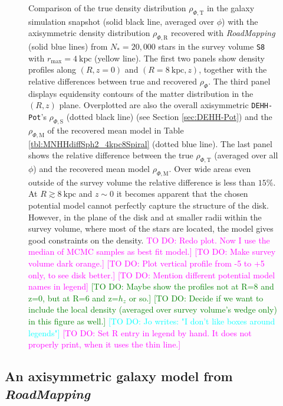 \documentclass[iop,revtex4,numberedappendix,appendixfloats]{emulateapj}
\newcommand{\RM}{{\sl RoadMapping}}
\newcommand{\Wilma}[1]{\textcolor{Magenta}{#1}}
\newcommand{\HW}[1]{\textcolor{Green}{#1}}
\newcommand{\Jo}[1]{\textcolor{Cyan}{#1}}
\begin{document}
\begin{figure}[!htbp]
\caption{Comparison of the true density distribution $\rho_{\Phi,\text{T}}$ in the galaxy simulation snapshot (solid black line, averaged over $\phi$) with the axisymmetric density distribution $\rho_{\Phi,\text{R}}$ recovered with \RM{} (solid blue lines) from $N_*=20,000$ stars in the survey volume \texttt{S8} with $r_\text{max}=4~\text{kpc}$ (yellow line). The first two panels show density profiles along $(R,z=0)$ and $(R=8~\text{kpc},z)$, together with the relative differences between true and recovered $\rho_{\Phi}$. The third panel displays equidensity contours of the matter distribution in the $(R,z)$ plane. Overplotted are also the overall axisymmetric \texttt{DEHH-Pot}'s $\rho_{\Phi,\text{S}}$ (dotted black line) (see Section \ref{sec:DEHH-Pot}) and the $\rho_{\Phi,\text{M}}$ of the recovered mean model in Table \ref{tbl:MNHHdiffSph2_4kpc8Spiral} (dotted blue line). The last panel shows the relative difference between the true $\rho_{\Phi,\text{T}}$ (averaged over all $\phi$) and the recovered mean model $\rho_{\Phi,\text{M}}$. Over wide areas even outside of the survey volume the relative difference is less than $15\%$. At $R\gtrsim8~\text{kpc}$ and $z\sim0$ it becomes apparent that the chosen potential model cannot perfectly capture the structure of the disk. However, in the plane of the disk and at smaller radii within the survey volume, where most of the stars are located, the model gives good constraints on the density.  \Wilma{TO DO: Redo plot. Now I use the median of MCMC samples as best fit model.]} \Wilma{[TO DO: Make survey volume dark orange.]} \Wilma{[TO DO: Plot vertical profile from -5 to +5 only, to see disk better.]} \Wilma{[TO DO: Mention different potential model names in legend]} \HW{[TO DO: Maybe show the profiles not at R=8 and z=0, but at R=6 and z=$h_z$ or so.]} \HW{[TO DO: Decide if we want to include the local density (averaged over survey volume's wedge only) in this figure as well.]} \Jo{[TO DO: Jo writes: "I don't like boxes around legends"]} \Wilma{[TO DO: Set R entry in legend by hand. It does not properly print, when it uses the thin line.]}}
\label{fig:4kpc8Spiral_density}
\end{figure}


\subsection{An axisymmetric galaxy model from \RM{}} \label{sec:results_part1}
\end{document}
